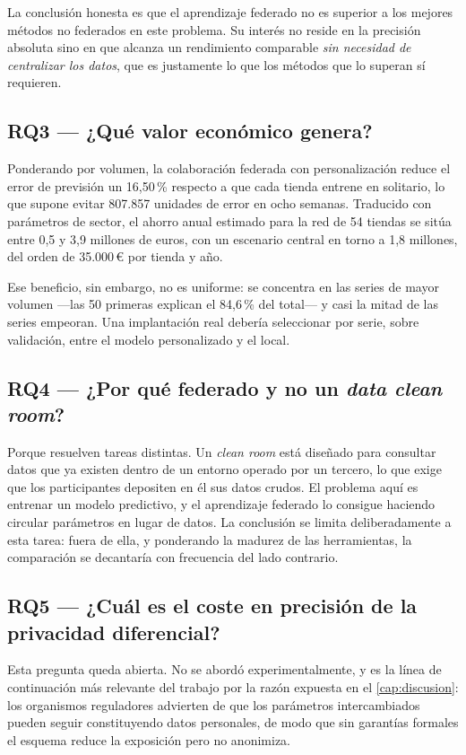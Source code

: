 La conclusión honesta es que el aprendizaje federado no es superior a los mejores métodos no
federados en este problema. Su interés no reside en la precisión absoluta sino en que alcanza un
rendimiento comparable \emph{sin necesidad de centralizar los datos}, que es justamente lo que los
métodos que lo superan sí requieren.

\subsection*{RQ3 — ¿Qué valor económico genera?}

Ponderando por volumen, la colaboración federada con personalización reduce el error de previsión
un 16,50\,\% respecto a que cada tienda entrene en solitario, lo que supone evitar 807.857 unidades
de error en ocho semanas. Traducido con parámetros de sector, el ahorro anual estimado para la red
de 54 tiendas se sitúa entre 0,5 y 3,9 millones de euros, con un escenario central en torno a 1,8
millones, del orden de 35.000\,€ por tienda y año.

Ese beneficio, sin embargo, no es uniforme: se concentra en las series de mayor volumen —las 50
primeras explican el 84,6\,\% del total— y casi la mitad de las series empeoran. Una implantación
real debería seleccionar por serie, sobre validación, entre el modelo personalizado y el local.

\subsection*{RQ4 — ¿Por qué federado y no un \emph{data clean room}?}

Porque resuelven tareas distintas. Un \emph{clean room} está diseñado para consultar datos que ya
existen dentro de un entorno operado por un tercero, lo que exige que los participantes depositen
en él sus datos crudos. El problema aquí es entrenar un modelo predictivo, y el aprendizaje
federado lo consigue haciendo circular parámetros en lugar de datos. La conclusión se limita
deliberadamente a esta tarea: fuera de ella, y ponderando la madurez de las herramientas, la
comparación se decantaría con frecuencia del lado contrario.

\subsection*{RQ5 — ¿Cuál es el coste en precisión de la privacidad diferencial?}

Esta pregunta queda abierta. No se abordó experimentalmente, y es la línea de continuación más
relevante del trabajo por la razón expuesta en el \cref{cap:discusion}: los organismos reguladores
advierten de que los parámetros intercambiados pueden seguir constituyendo datos personales, de modo
que sin garantías formales el esquema reduce la exposición pero no anonimiza.

